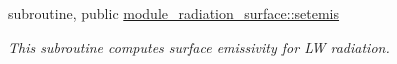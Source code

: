{\bf }\par
\begin{DoxyCompactItemize}
\item 
subroutine, public \hyperlink{group__module__radiation__surface_ga896fc2234aac2330a62f0076bab97634}{module\+\_\+radiation\+\_\+surface\+::setemis}
\begin{DoxyCompactList}\small\item\em This subroutine computes surface emissivity for LW radiation. \end{DoxyCompactList}\end{DoxyCompactItemize}


